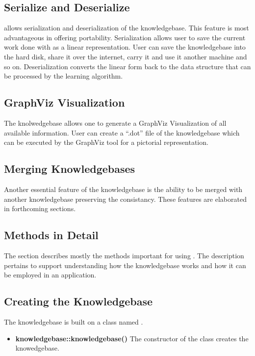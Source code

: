 \subsection*{Serialize and Deserialize} 
\libalf allows serialization and deserialization of the knowledgebase. This feature is most advantageous in offering portability. Serialization allows user to save the current work done with \libalf as a linear representation. User can save the knowledgebase into the hard disk, share it over the internet, carry it and use it another machine and so on. Deserialization converts the linear form back to the data structure that can be processed by the learning algorithm.

\subsection*{GraphViz Visualization} 
The knolwedgebase allows one to generate a GraphViz Visualization of all available information. User can create a ``.dot'' file of the knowledgebase which can be executed by the GraphViz tool for a pictorial representation.

\subsection*{Merging Knowledgebases} 
Another essential feature of the knowledgebase is the ability to be merged with another knowledgebase preserving the consistancy. These features are elaborated in forthcoming sections.

\subsection{Methods in Detail}
The section describes mostly the methods important for using \libalf. The description pertains to support understanding how the knowledgebase works and how it can be employed in an application. 
	
\subsection*{Creating the Knowledgebase}
The knowledgebase is built on a class named \knowledgebase. 
\begin{itemize}
 \item \textbf{knowledgebase::knowledgebase()} \vskip 1pt
	The constructor of the \knowledgebase class creates the knowedgebase.
\end{itemize}
	
